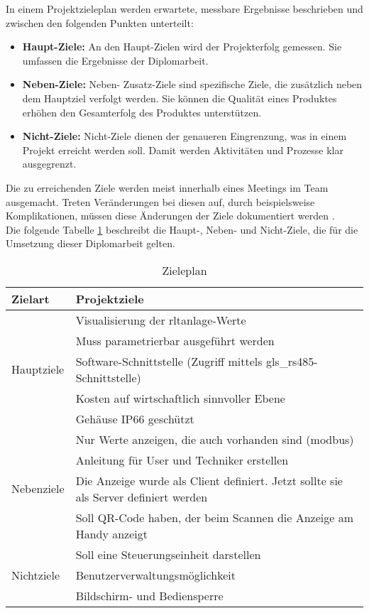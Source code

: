In einem Projektzieleplan werden erwartete, messbare Ergebnisse beschrieben und zwischen den folgenden Punkten unterteilt:
\begin{itemize}
	\item \textbf{Haupt-Ziele:} An den Haupt-Zielen wird der  Projekterfolg gemessen. Sie umfassen die Ergebnisse der Diplomarbeit.
	\item \textbf{Neben-Ziele:} Neben- \bzw Zusatz-Ziele sind spezifische Ziele, die zusätzlich neben dem Hauptziel verfolgt werden. Sie können die Qualität eines Produktes erhöhen \bzw den Gesamterfolg des Produktes unterstützen.
	\item \textbf{Nicht-Ziele:} Nicht-Ziele dienen der genaueren Eingrenzung, was in einem Projekt erreicht werden soll. Damit werden Aktivitäten und Prozesse klar ausgegrenzt.
\end{itemize}
Die zu erreichenden Ziele werden meist innerhalb eines Meetings im Team ausgemacht. Treten Veränderungen bei diesen auf, durch beispielsweise Komplikationen, müssen diese Änderungen der Ziele dokumentiert werden \cite[vgl.][]{Diplomarbeiten-bbs:o.J.}. \\ 
Die folgende Tabelle \ref{tab:ziele_plan} beschreibt die Haupt-, Neben- und Nicht-Ziele, die für die Umsetzung dieser Diplomarbeit gelten.
\begin{table}[htpb]
	\caption{Zieleplan}
	\label{tab:ziele_plan}
	\begin{tabular}{p{} | p{}}
		\toprule
		\textbf{Zielart} & \textbf{Projektziele} \\
		\midrule
		& Visualisierung der \acs{rltanlage}-Werte
		\\
		& Muss parametrierbar ausgeführt werden
		\\
		Hauptziele & Software-Schnittstelle (Zugriff mittels \gls{gls_rs485}-Schnittstelle)
		\\
		& Kosten auf wirtschaftlich sinnvoller Ebene
		\\
		& Gehäuse IP66 geschützt 
		\\
		\midrule
		& Nur Werte anzeigen, die auch vorhanden sind (\gls{modbus})
		\\
		& Anleitung für User und Techniker erstellen
		\\
		Nebenziele & Die Anzeige wurde als Client definiert. Jetzt sollte sie als Server definiert werden
		\\
		& Soll QR-Code haben, der beim Scannen die Anzeige am Handy anzeigt
		\\
		\midrule
		& Soll eine Steuerungseinheit darstellen
		\\
		Nichtziele & Benutzerverwaltungsmöglichkeit
		\\
		& Bildschirm- und Bediensperre
		\\
		\bottomrule
	\end{tabular}
\end{table}